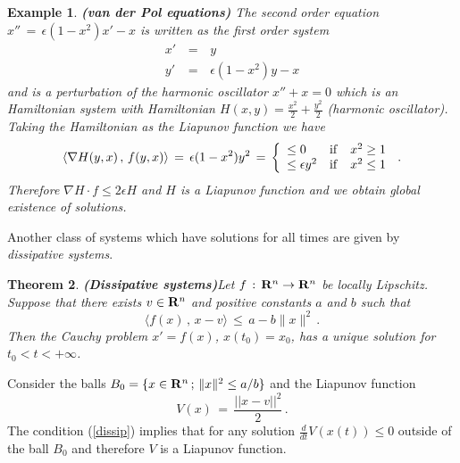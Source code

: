 \documentclass[12pt]{report}
\newcommand{\bR}{{\bf R}}
\newtheorem{theorem}{Theorem}[section]
\newtheorem{example}[theorem]{Example}
\newcommand{\proof}{\noindent {\em Proof:~}}
\newcommand{\nn}{\nonumber}
\def\eqref#1{(\ref{#1})}
\def\qed{\hbox{\hskip 6pt\vrule width6pt height7pt depth1pt
    \hskip1pt}\bigskip}
\def\to{\rightarrow}
\begin{document}
\begin{example}{\bf (van der Pol equations)}{\rm  
The second order equation $x''\,=\, 
\epsilon(1-x^2) x' - x$  is written as the first order system
\begin{eqnarray}
x'\,&=&\, y  \nn \\
y' \,&=&\, \epsilon(1-x^2) y - x \label{vp}
\end{eqnarray}
and is a perturbation of the harmonic oscillator $x''+x=0$ which is an
Hamiltonian system with Hamiltonian $H(x,y) = \frac{x^2}{2} + \frac{
y^2}{2}$ (harmonic oscillator).  Taking the Hamiltonian as the
Liapunov function we have
\begin{equation}
\langle \nabla H(y,x)\,,\,  f(y,x) \rangle \,=\, \epsilon (1 - x^2) y^2 \,=\, 
\left\{ \begin{array}{lcl} \le 0 & {\rm if} & x^2 \ge 1 \\
\le  \epsilon y^2 &  {\rm if} & x^2 \le 1  \end{array} \right. \,.
\end{equation}
Therefore $\nabla H \cdot f \le 2\epsilon H$ and $H$ is a Liapunov
function and we obtain global existence of solutions. }
\end{example}


Another class of systems which have solutions for all times are given by
{\em dissipative systems}.
 
\begin{theorem}{\bf (Dissipative systems)}\label{disy} Let 
$f \,:\, \bR^n \to \bR^n$  be locally Lipschitz. Suppose that there exists 
$v \in \bR^n$ and positive constants $a$ and $b$ such that 
\begin{equation}\label{dissip}
\langle f(x)\,,\, x-v \rangle \, \le \, a - b \|x\|^2 \,.
\end{equation}
Then the Cauchy problem $x'=f(x)$, $x(t_0) = x_0$, 
has a unique solution for   $t_0  < t <  +\infty$. 
\end{theorem}


\proof  Consider the balls $B_0 =\{ x \in \bR^n\,;\, \|x\|^2 \le a/b
\}$ and the Liapunov function 
\begin{equation} 
V(x) \,=\,  \frac{ || x-v ||^2}{2} \,.
\end{equation}
The condition \eqref{dissip} implies that for any solution
$\frac{d}{dt} V(x(t)) \le 0$ outside of the ball $B_0$ and therefore
$V$ is a Liapunov function.  \hfill \qed
\end{document}

